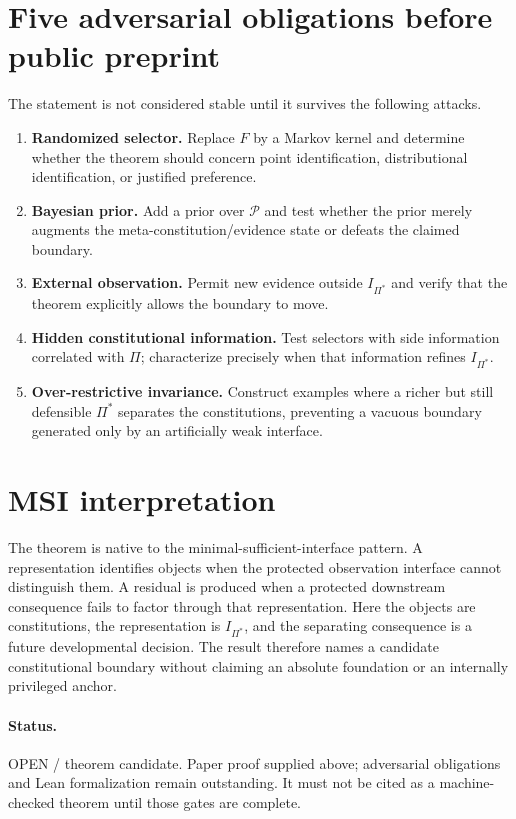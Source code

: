 \documentclass[11pt]{article}
\begin{document}
\section{Five adversarial obligations before public preprint}
The statement is not considered stable until it survives the following attacks.
\begin{enumerate}
\item \textbf{Randomized selector.} Replace $F$ by a Markov kernel and determine whether the theorem should concern point identification, distributional identification, or justified preference.
\item \textbf{Bayesian prior.} Add a prior over $\mathcal P$ and test whether the prior merely augments the meta-constitution/evidence state or defeats the claimed boundary.
\item \textbf{External observation.} Permit new evidence outside $I_{\Pi^*}$ and verify that the theorem explicitly allows the boundary to move.
\item \textbf{Hidden constitutional information.} Test selectors with side information correlated with $\Pi$; characterize precisely when that information refines $I_{\Pi^*}$.
\item \textbf{Over-restrictive invariance.} Construct examples where a richer but still defensible $\Pi^*$ separates the constitutions, preventing a vacuous boundary generated only by an artificially weak interface.
\end{enumerate}

\section{MSI interpretation}
The theorem is native to the minimal-sufficient-interface pattern. A representation identifies objects when the protected observation interface cannot distinguish them. A residual is produced when a protected downstream consequence fails to factor through that representation. Here the objects are constitutions, the representation is $I_{\Pi^*}$, and the separating consequence is a future developmental decision. The result therefore names a candidate constitutional boundary without claiming an absolute foundation or an internally privileged anchor.

\paragraph{Status.} OPEN / theorem candidate. Paper proof supplied above; adversarial obligations and Lean formalization remain outstanding. It must not be cited as a machine-checked theorem until those gates are complete.
\end{document}

